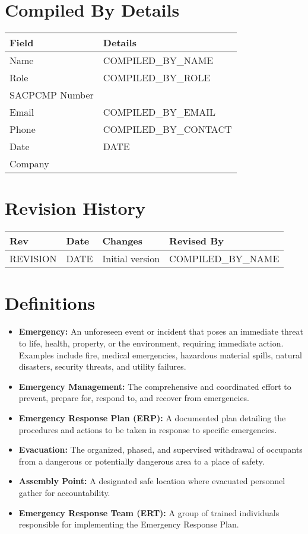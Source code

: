\documentclass[11pt]{article}
\newcommand{\issueDate}{{{DATE}}}
\newcommand{\compilerName}{{{COMPILED_BY_NAME}}}
\newcommand{\compilerRole}{{{COMPILED_BY_ROLE}}}
\newcommand{\compilerSACPCMP}{}
\newcommand{\compilerEmail}{{{COMPILED_BY_EMAIL}}}
\newcommand{\compilerPhone}{{{COMPILED_BY_CONTACT}}}
\newcommand{\compilerCompany}{}
\newcommand{\revision}{{{REVISION}}}
\begin{document}
\section{Compiled By Details}
\begin{tabularx}{\textwidth}{lX}
  \toprule
  \textbf{Field} & \textbf{Details} \\
  \midrule
  Name & \compilerName \\
  Role & \compilerRole \\
  SACPCMP Number & \compilerSACPCMP \\
  Email & \compilerEmail \\
  Phone & \compilerPhone \\
  Date & \issueDate \\
  Company & \compilerCompany \\
  \bottomrule
\end{tabularx}

\section{Revision History}
\begin{tabularx}{\textwidth}{lXll}
  \toprule
  \textbf{Rev} & \textbf{Date} & \textbf{Changes} & \textbf{Revised By} \\
  \midrule
  \revision & \issueDate & Initial version & \compilerName \\
  \bottomrule
\end{tabularx}

\section{Definitions}
\begin{itemize}
    \item \textbf{Emergency:} An unforeseen event or incident that poses an immediate threat to life, health, property, or the environment, requiring immediate action. Examples include fire, medical emergencies, hazardous material spills, natural disasters, security threats, and utility failures.
    \item \textbf{Emergency Management:} The comprehensive and coordinated effort to prevent, prepare for, respond to, and recover from emergencies.
    \item \textbf{Emergency Response Plan (ERP):} A documented plan detailing the procedures and actions to be taken in response to specific emergencies.
    \item \textbf{Evacuation:} The organized, phased, and supervised withdrawal of occupants from a dangerous or potentially dangerous area to a place of safety.
    \item \textbf{Assembly Point:} A designated safe location where evacuated personnel gather for accountability.
    \item \textbf{Emergency Response Team (ERT):} A group of trained individuals responsible for implementing the Emergency Response Plan.
\end{itemize}
\end{document}
